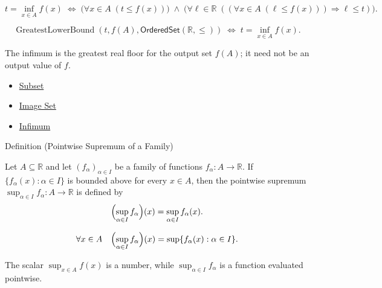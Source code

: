 \begin{remark*}
\[
  t=\inf_{x\in A}f(x)
  \;\Longleftrightarrow\;
  \bigl(\forall x\in A\;(t\leq f(x))\bigr)
  \;\wedge\;
  \bigl(\forall \ell\in\mathbb{R}\;((\forall x\in A\;(\ell\leq f(x)))\Rightarrow \ell\leq t)\bigr).
\]
\end{remark*}

\begin{remark*}
\[
  \operatorname{GreatestLowerBound}(t,f(A),\mathsf{OrderedSet}(\mathbb{R},\leq))
  \;\Longleftrightarrow\;
  t=\inf_{x\in A}f(x).
\]
\end{remark*}

\begin{remark*}[Interpretation]
The infimum is the greatest real floor for the output set $f(A)$; it need
not be an output value of $f$.
\end{remark*}

\begin{dependencies}
\begin{itemize}
  \item \hyperref[def:subset]{Subset}
  \item \hyperref[def:image-set]{Image Set}
  \item \hyperref[def:infimum]{Infimum}
\end{itemize}
\end{dependencies}

\begin{definitionbox}{Definition (Pointwise Supremum of a Family)}
\begin{definition}
\label{def:pointwise-supremum-family}
Let \(A\subseteq\mathbb{R}\) and let \((f_\alpha)_{\alpha\in I}\) be a
family of functions \(f_\alpha:A\to\mathbb{R}\).  If
\(\{f_\alpha(x):\alpha\in I\}\) is bounded above for every \(x\in A\), then
the pointwise supremum \(\sup_{\alpha\in I} f_\alpha:A\to\mathbb{R}\) is
defined by
\[
  \Bigl(\sup_{\alpha\in I} f_\alpha\Bigr)(x)
  =
  \sup_{\alpha\in I} f_\alpha(x).
\]
\end{definition}
\end{definitionbox}

\begin{remark*}
\[
  \forall x\in A\quad
  \Bigl(\sup_{\alpha\in I} f_\alpha\Bigr)(x)
  =
  \sup\{f_\alpha(x):\alpha\in I\}.
\]
\end{remark*}

\begin{remark*}[Interpretation]
The scalar \(\sup_{x\in A}f(x)\) is a number, while
\(\sup_{\alpha\in I}f_\alpha\) is a function evaluated pointwise.
\end{remark*}

